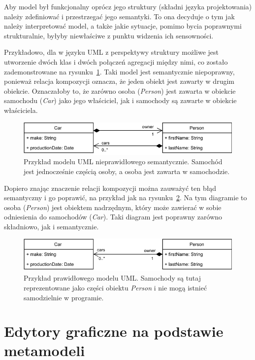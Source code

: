 Aby model był funkcjonalny oprócz jego struktury (składni języka projektowania)
należy zdefiniować i przestrzegać jego semantyki. To ona decyduje o tym jak
należy interpretować model, a także jakie sytuacje, pomimo bycia poprawnymi
strukturalnie, byłyby niewłaściwe z punktu widzenia ich sensowności.

Przykładowo, dla w języku \gls{UML} z perspektywy struktury możliwe jest
utworzenie dwóch klas i dwóch połączeń agregacji między nimi, co zostało
zademonstrowane na rysunku~\ref{rys:nieprawidlowy-model-uml}. Taki model jest
semantycznie niepoprawny, ponieważ relacja kompozycji oznacza, że jeden obiekt
jest zawarty w drugim obiekcie. Oznaczałoby to, że zarówno osoba
(\emph{Person}) jest zawarta w obiekcie samochodu (\emph{Car}) jako jego
właściciel, jak i samochody są zawarte w obiekcie właściciela.

\begin{figure}[!hb]
	\centering

	\includegraphics[width=0.95\linewidth]{./images/invalid-uml-example.pdf}
	\caption{Przykład modelu \gls{UML} nieprawidłowego semantycznie.
		Samochód jest jednocześnie częścią osoby, a osoba jest zawarta
		w samochodzie.
	}\label{rys:nieprawidlowy-model-uml}
\end{figure}

Dopiero znając znaczenie relacji kompozycji można zauważyć ten błąd semantyczny
i go poprawić, na przykład jak na rysunku~\ref{rys:prawidlowy-model-uml}. Na
tym diagramie to osoba (\emph{Person}) jest obiektem nadrzędnym, który może
zawierać w sobie odniesienia do samochodów (\emph{Car}). Taki diagram jest
poprawny zarówno składniowo, jak i semantycznie.

\begin{figure}[!hb]
	\centering

	\includegraphics[width=0.95\linewidth]{./images/valid-uml-example.pdf}
	\caption{Przykład prawidłowego modelu
		\gls{UML}. Samochody są tutaj reprezentowane jako części
		obiektu
		\emph{Person} i nie mogą istnieć samodzielnie w
		programie.}\label{rys:prawidlowy-model-uml}
\end{figure}

\section{Edytory graficzne na podstawie metamodeli}

